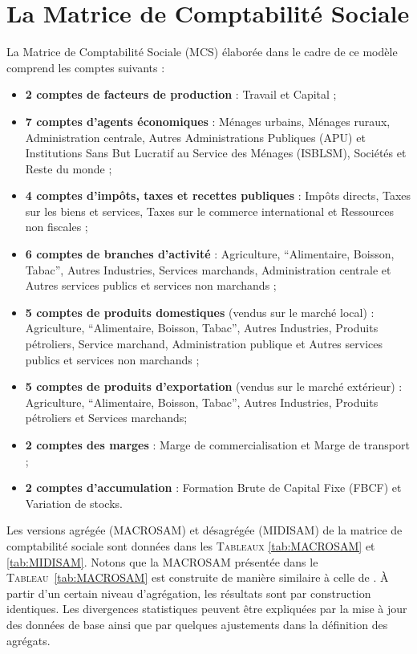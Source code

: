 \documentclass[11pt,a4paper]{article}
\begin{document}
	\section{La Matrice de Comptabilité Sociale}
	La Matrice de Comptabilité Sociale (MCS) élaborée dans le cadre de ce modèle comprend les comptes suivants :
	\begin{itemize}
		\item[$\bullet$] \textbf{2 comptes de facteurs de production} : Travail et Capital ;
		\item[$\bullet$] \textbf{7 comptes d’agents économiques} : Ménages urbains, Ménages ruraux, Administration centrale, Autres Administrations Publiques (APU) et Institutions Sans But Lucratif au Service des Ménages (ISBLSM), Sociétés et Reste du monde ;
		\item[$\bullet$] \textbf{4 comptes d'impôts, taxes et recettes publiques} : Impôts directs, Taxes sur les biens et services, Taxes sur le commerce international et Ressources non fiscales ;
		\item[$\bullet$] \textbf{6 comptes de branches d’activité} : Agriculture, ``Alimentaire, Boisson, Tabac'', Autres Industries, Services marchands, Administration centrale et Autres services publics et services non marchands ;
		\item[$\bullet$] \textbf{5 comptes de produits domestiques} (vendus sur le marché local) : Agriculture, ``Alimentaire, Boisson, Tabac'', Autres Industries, Produits pétroliers, Service marchand, Administration publique et Autres services publics et services non marchands ;
		\item[$\bullet$] \textbf{5 comptes de produits d’exportation} (vendus sur le marché extérieur) : Agriculture, ``Alimentaire, Boisson, Tabac'', Autres Industries, Produits pétroliers et Services marchands;
		\item[$\bullet$] \textbf{2 comptes des marges} : Marge de commercialisation et Marge de transport ;
		\item[$\bullet$] \textbf{2 comptes d’accumulation} : Formation Brute de Capital Fixe (FBCF) et Variation de stocks.
	\end{itemize}
	
	Les versions agrégée (MACROSAM) et désagrégée (MIDISAM) de la matrice de comptabilité sociale sont données dans les \textsc{Tableaux} \ref{tab:MACROSAM} et \ref{tab:MIDISAM}. Notons que la MACROSAM présentée dans le \textsc{Tableau}~\ref{tab:MACROSAM} est construite de manière similaire à celle de \cite{Ramaharo2022}. À partir d'un certain niveau d'agrégation, les résultats sont par construction identiques. Les  divergences statistiques peuvent être expliquées par la mise à jour des données de base ainsi que par quelques ajustements dans la définition des agrégats.
	
\end{document}
